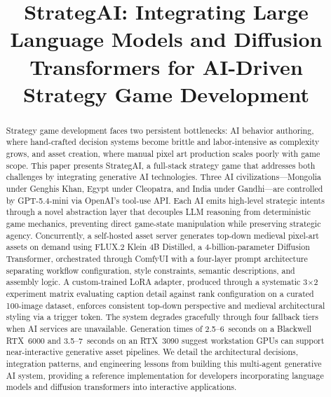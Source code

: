\documentclass[conference]{IEEEtran}
\begin{document}
\title{StrategAI: Integrating Large Language Models and Diffusion Transformers
       for AI-Driven Strategy Game Development}

\author{
}

\maketitle

\begin{abstract}
Strategy game development faces two persistent bottlenecks: AI behavior
authoring, where hand-crafted decision systems become brittle and
labor-intensive as complexity grows, and asset creation, where manual pixel
art production scales poorly with game scope. This paper presents
StrategAI, a full-stack strategy game that addresses both challenges by
integrating generative AI technologies. Three AI civilizations---Mongolia
under Genghis Khan, Egypt under Cleopatra, and India under Gandhi---are
controlled by GPT-5.4-mini via OpenAI's tool-use API. Each AI emits
high-level strategic intents through a novel abstraction layer that
decouples LLM reasoning from deterministic game mechanics, preventing
direct game-state manipulation while preserving strategic agency.
Concurrently, a self-hosted asset server generates top-down medieval
pixel-art assets on demand using FLUX.2 Klein 4B Distilled, a 4-billion-parameter
Diffusion Transformer, orchestrated through ComfyUI with a four-layer
prompt architecture separating workflow configuration, style constraints,
semantic descriptions, and assembly logic. A custom-trained LoRA adapter,
produced through a systematic 3$\times$2 experiment matrix evaluating
caption detail against rank configuration on a curated 100-image dataset,
enforces consistent top-down perspective and medieval architectural styling
via a trigger token. The system degrades gracefully through four fallback
tiers when AI services are unavailable. Generation times of 2.5--6~seconds
on a Blackwell RTX~6000 and 3.5--7~seconds on an RTX~3090 suggest
workstation GPUs can support near-interactive generative asset pipelines.
We detail the architectural decisions, integration patterns, and
engineering lessons from building this multi-agent generative AI system,
providing a reference implementation for developers incorporating language
models and diffusion transformers into interactive applications.
\end{abstract}
\end{document}
